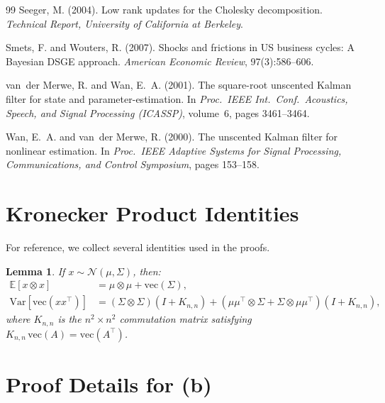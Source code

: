 \documentclass[12pt,a4paper]{article}
\newtheorem{lemma}[theorem]{Lemma}
\newcommand{\E}{\mathbb{E}}
\newcommand{\Var}{\mathrm{Var}}
\newcommand{\vect}{\mathrm{vec}}
\newcommand{\kron}{\otimes}
\begin{document}
\begin{thebibliography}{99}
Seeger, M. (2004).
\newblock Low rank updates for the {Cholesky} decomposition.
\newblock \emph{Technical Report, University of California at Berkeley}.

Smets, F. and Wouters, R. (2007).
\newblock Shocks and frictions in {US} business cycles: A {Bayesian DSGE}
  approach.
\newblock \emph{American Economic Review}, 97(3):586--606.

van~der Merwe, R. and Wan, E.~A. (2001).
\newblock The square-root unscented {Kalman} filter for state and
  parameter-estimation.
\newblock In \emph{Proc.\ IEEE Int.\ Conf.\ Acoustics, Speech, and Signal
  Processing (ICASSP)}, volume~6, pages 3461--3464.

Wan, E.~A. and van~der Merwe, R. (2000).
\newblock The unscented {Kalman} filter for nonlinear estimation.
\newblock In \emph{Proc.\ IEEE Adaptive Systems for Signal Processing,
  Communications, and Control Symposium}, pages 153--158.

\end{thebibliography}


\appendix

\section{Kronecker Product Identities}\label{app:kron}

For reference, we collect several identities used in the proofs.

\begin{lemma}\label{lem:kron-expect}
If $x \sim \mathcal{N}(\mu, \Sigma)$, then:
\begin{align}
\E[x \kron x] &= \mu \kron \mu + \vect(\Sigma),
  \label{eq:kron-mean} \\
\Var[\vect(xx^\top)] &=
  (\Sigma \kron \Sigma)(I + K_{n,n})
  + (\mu\mu^\top \kron \Sigma + \Sigma \kron \mu\mu^\top)
  (I + K_{n,n}),
  \label{eq:kron-var}
\end{align}
where $K_{n,n}$ is the $n^2 \times n^2$ commutation matrix satisfying
$K_{n,n}\,\vect(A) = \vect(A^\top)$.
\end{lemma}

\section{Proof Details for (b)}\label{app:cov-proof}
\end{document}
